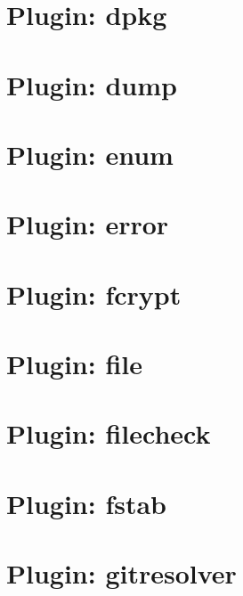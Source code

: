 \documentclass[twoside]{book}
\newcommand{\+}{\discretionary{\mbox{\scriptsize$\hookleftarrow$}}{}{}}
\begin{document}
\chapter{Plugin\+: dpkg}
\label{md_src_plugins_dpkg_README}

\chapter{Plugin\+: dump}
\label{md_src_plugins_dump_README}

\chapter{Plugin\+: enum}
\label{md_src_plugins_enum_README}

\chapter{Plugin\+: error}
\label{md_src_plugins_error_README}

\chapter{Plugin\+: fcrypt}
\label{md_src_plugins_fcrypt_README}

\chapter{Plugin\+: file}
\label{md_src_plugins_file_README}

\chapter{Plugin\+: filecheck}
\label{md_src_plugins_filecheck_README}

\chapter{Plugin\+: fstab}
\label{md_src_plugins_fstab_README}

\chapter{Plugin\+: gitresolver}
\label{md_src_plugins_gitresolver_README}

\end{document}
